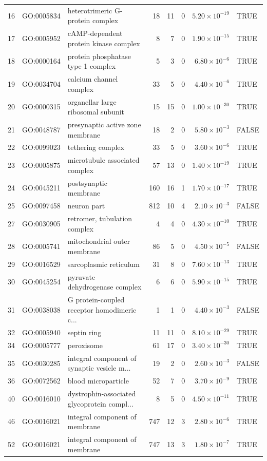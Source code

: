 \begin{table}[ht]
\begin{adjustbox}{max width=\textwidth}
\begin{tabular}{lllrrrrl}
  16 & GO:0005834 & heterotrimeric G-protein complex & 18 & 11 & 0 & $5.20 \times 10^{-19}$ & TRUE \\ 
  17 & GO:0005952 & cAMP-dependent protein kinase complex & 8 & 7 & 0 & $1.90 \times 10^{-15}$ & TRUE \\ 
  18 & GO:0000164 & protein phosphatase type 1 complex & 5 & 3 & 0 & $6.80 \times 10^{-6}$ & TRUE \\ 
  19 & GO:0034704 & calcium channel complex & 33 & 5 & 0 & $4.40 \times 10^{-6}$ & TRUE \\ 
  20 & GO:0000315 & organellar large ribosomal subunit & 15 & 15 & 0 & $1.00 \times 10^{-30}$ & TRUE \\ 
  21 & GO:0048787 & presynaptic active zone membrane & 18 & 2 & 0 & $5.80 \times 10^{-3}$ & FALSE \\ 
  22 & GO:0099023 & tethering complex & 33 & 5 & 0 & $3.60 \times 10^{-6}$ & TRUE \\ 
  23 & GO:0005875 & microtubule associated complex & 57 & 13 & 0 & $1.40 \times 10^{-19}$ & TRUE \\ 
  24 & GO:0045211 & postsynaptic membrane & 160 & 16 & 1 & $1.70 \times 10^{-17}$ & TRUE \\ 
  25 & GO:0097458 & neuron part & 812 & 10 & 4 & $2.10 \times 10^{-3}$ & FALSE \\ 
  27 & GO:0030905 & retromer, tubulation complex & 4 & 4 & 0 & $4.30 \times 10^{-10}$ & TRUE \\ 
  28 & GO:0005741 & mitochondrial outer membrane & 86 & 5 & 0 & $4.50 \times 10^{-5}$ & FALSE \\ 
  29 & GO:0016529 & sarcoplasmic reticulum & 31 & 8 & 0 & $7.60 \times 10^{-13}$ & TRUE \\ 
  30 & GO:0045254 & pyruvate dehydrogenase complex & 6 & 6 & 0 & $5.90 \times 10^{-15}$ & TRUE \\ 
  31 & GO:0038038 & G protein-coupled receptor homodimeric c... & 1 & 1 & 0 & $4.40 \times 10^{-3}$ & FALSE \\ 
  32 & GO:0005940 & septin ring & 11 & 11 & 0 & $8.10 \times 10^{-29}$ & TRUE \\ 
  34 & GO:0005777 & peroxisome & 61 & 17 & 0 & $3.40 \times 10^{-30}$ & TRUE \\ 
  35 & GO:0030285 & integral component of synaptic vesicle m... & 19 & 2 & 0 & $2.60 \times 10^{-3}$ & FALSE \\ 
  36 & GO:0072562 & blood microparticle & 52 & 7 & 0 & $3.70 \times 10^{-9}$ & TRUE \\ 
  40 & GO:0016010 & dystrophin-associated glycoprotein compl... & 8 & 5 & 0 & $4.50 \times 10^{-11}$ & TRUE \\ 
  46 & GO:0016021 & integral component of membrane & 747 & 12 & 3 & $2.80 \times 10^{-6}$ & TRUE \\ 
  52 & GO:0016021 & integral component of membrane & 747 & 13 & 3 & $1.80 \times 10^{-7}$ & TRUE \\ 
   \hline
\end{tabular}
\end{adjustbox}



\end{table}
